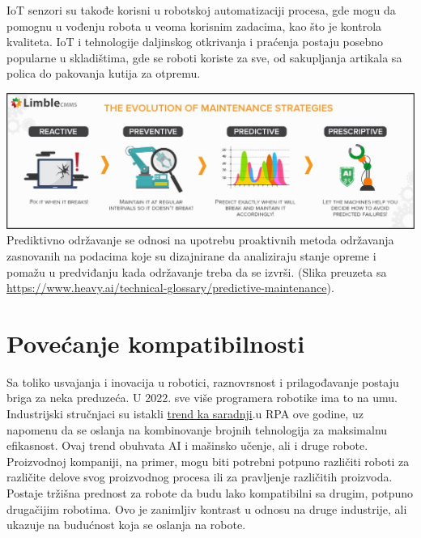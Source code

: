 \documentclass{report}
\begin{document}
	IoT senzori su takođe korisni u robotskoj automatizaciji procesa, gde mogu da pomognu u vođenju robota u veoma korisnim zadacima, kao što je kontrola kvaliteta. IoT i tehnologije daljinskog otkrivanja i praćenja postaju posebno popularne u skladištima, gde se roboti koriste za sve, od sakupljanja artikala sa polica do pakovanja kutija za otpremu.
	\cite{robotic2022}
	
	
	\centering
	\vspace{2cm}
	\includegraphics[scale=0.37]{dijagram.jpeg}
	Prediktivno održavanje se odnosi na upotrebu proaktivnih metoda održavanja zasnovanih na podacima koje su dizajnirane da analiziraju stanje opreme i pomažu u predviđanju kada održavanje treba da se izvrši. (Slika preuzeta sa \url{https://www.heavy.ai/technical-glossary/predictive-maintenance}).
	
	\chapter{Povećanje kompatibilnosti}
	Sa toliko usvajanja i inovacija u robotici, raznovrsnost i prilagođavanje postaju briga za neka preduzeća. U 2022. sve više programera robotike ima to na umu. Industrijski stručnjaci su istakli
	\href{https://enterprisersproject.com/article/2022/1/4-robotic-process-automation-rpa-trends-watch-2022}{trend ka saradnji}.u RPA ove godine, uz napomenu da se oslanja na kombinovanje brojnih tehnologija za maksimalnu efikasnost.
	Ovaj trend obuhvata AI i mašinsko učenje, ali i druge robote. Proizvodnoj kompaniji, na primer, mogu biti potrebni potpuno različiti roboti za različite delove svog proizvodnog procesa ili za pravljenje različitih proizvoda. Postaje tržišna prednost za robote da budu lako kompatibilni sa drugim, potpuno drugačijim robotima. Ovo je zanimljiv kontrast u odnosu na druge industrije, ali ukazuje na budućnost koja se oslanja na robote.
	\cite{robot2022}
\end{document}
